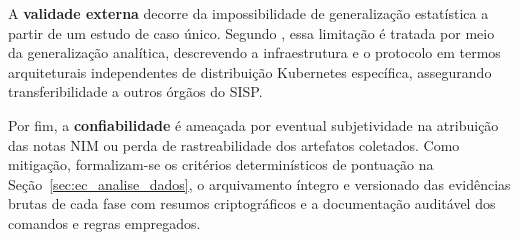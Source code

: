 A \textbf{validade externa} decorre da impossibilidade de generalização estatística a partir de um estudo de caso único. Segundo , essa limitação é tratada por meio da generalização analítica, descrevendo a infraestrutura e o protocolo em termos arquiteturais independentes de distribuição Kubernetes específica, assegurando transferibilidade a outros órgãos do SISP.

Por fim, a \textbf{confiabilidade} é ameaçada por eventual subjetividade na atribuição das notas NIM ou perda de rastreabilidade dos artefatos coletados. Como mitigação, formalizam-se os critérios determinísticos de pontuação na Seção~\ref{sec:ec_analise_dados}, o arquivamento íntegro e versionado das evidências brutas de cada fase com resumos criptográficos e a documentação auditável dos comandos e regras empregados.
